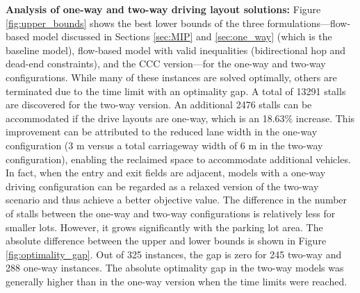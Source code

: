 \documentclass[10pt]{article}
\theoremstyle{definition}
\begin{document}
\textbf{Analysis of one-way and two-way driving layout solutions:} Figure \ref{fig:upper_bounds} shows the best lower bounds of the three formulations---flow-based model discussed in Sections \ref{sec:MIP} and \ref{sec:one_way} (which is the baseline model), flow-based model with valid inequalities (bidirectional hop and dead-end constraints), and the CCC version---for the one-way and two-way configurations. While many of these instances are solved optimally, others are terminated due to the time limit with an optimality gap. A total of 13291 stalls are discovered for the two-way version. An additional 2476 stalls can be accommodated if the drive layouts are one-way, which is an 18.63\% increase. This improvement can be attributed to the reduced lane width in the one-way configuration (3 m versus a total carriageway width of 6 m in the two-way configuration), enabling the reclaimed space to accommodate additional vehicles. In fact, when the entry and exit fields are adjacent, models with a one-way driving configuration can be regarded as a relaxed version of the two-way scenario and thus achieve a better objective value. The difference in the number of stalls between the one-way and two-way configurations is relatively less for smaller lots. However, it grows significantly with the parking lot area. The absolute difference between the upper and lower bounds is shown in Figure \ref{fig:optimality_gap}. Out of 325 instances, the gap is zero for 245 two-way and 288 one-way instances. The absolute optimality gap in the two-way models was generally higher than in the one-way version when the time limits were reached. 
\end{document}
